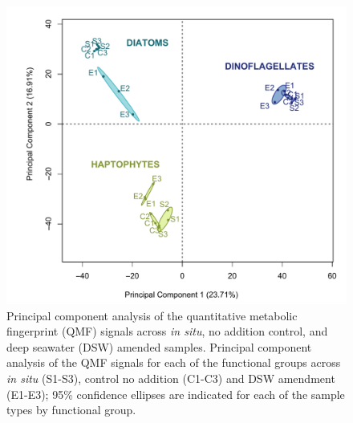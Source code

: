 
\begin{figure}[p!]
  \centering
    \includegraphics[width=1\textwidth]{Images/C4_FigureS7.pdf}
    \caption[Principal component analysis of the quantitative metabolic fingerprint (QMF) signals across \emph{in situ}, no addition control, and deep seawater amended samples]{Principal component analysis of the quantitative metabolic fingerprint (QMF) signals across \emph{in situ}, no addition control, and deep seawater (DSW) amended samples. Principal component analysis of the QMF signals for each of the functional groups across \emph{in situ} (S1-S3), control no addition (C1-C3) and DSW amendment (E1-E3); 95\% confidence ellipses are indicated for each of the sample types by functional group.}
  \label{fig:a4f7}
\end{figure}


